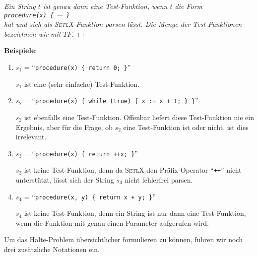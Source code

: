 \begin{Definition} 
{\em Ein String $t$ ist genau dann eine \emph{Test-Funktion}, wenn $t$ 
 die Form \\[0.3cm]
\hspace*{1.3cm} {\tt procedure(x) \{ $\cdots$ \}} \\[0.3cm]
hat und sich als \textsc{SetlX}-Funktion parsen l\"{a}sst.  Die Menge der
Test-Funktionen bezeichnen wir mit $T\!F$.}  \hspace*{\fill} $\Box$
\end{Definition}

\noindent
\textbf{Beispiele}:  
\begin{enumerate}
\item $s_1$ = ``{\tt procedure(x) \{ return 0; \}}''

      $s_1$ ist eine (sehr einfache) Test-Funktion.
\item $s_2$ = ``{\tt procedure(x) \{ while (true) \{ x := x + 1; \} \}}''

      $s_2$ ist ebenfalls eine Test-Funktion.  Offenbar liefert diese Test-Funktion nie ein
      Ergebnis, aber f\"{u}r die Frage, ob $s_2$ eine Test-Funktion ist oder nicht, ist dies
      irrelevant.
\item $s_3$ = ``{\tt procedure(x) \{ return ++x; \}}''

      $s_3$ ist keine Test-Funktion, denn da \textsc{SetlX} den Pr\"{a}fix-Operator
      ``\texttt{++}'' nicht unterst\"{u}tzt, l\"{a}sst sich der String $s_3$  nicht fehlerfrei parsen.
\item $s_4$ = ``{\tt procedure(x, y) \{ return x + y; \}}''

      $s_4$ ist keine Test-Funktion, denn ein String ist nur dann eine Test-Funktion, wenn die Funktion
      mit genau einen Parameter aufgerufen wird.
\end{enumerate}
Um das Halte-Problem \"{u}bersichtlicher formulieren zu k\"{o}nnen, f\"{u}hren wir noch drei
zus\"{a}tzliche Notationen ein.
